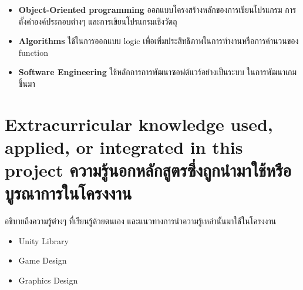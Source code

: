 \begin{itemize}
  \item \textbf{Object-Oriented programming} ออกแบบโครงสร้างหลักของการเขียนโปรแกรม การตั้งค่าองค์ประกอบต่างๆ และการเขียนโปรแกรมเชิงวัตถุ
  \item \textbf{Algorithms} ใช้ในการออกแบบ logic เพื่อเพิ่มประสิทธิภาพในการทำงานหรือการคำนวนของ function
  \item \textbf{Software Engineering} ใช้หลักการการพัฒนาซอฟต์แวร์อย่างเป็นระบบ ในการพัฒนาเกมขึ้นมา
\end{itemize}

\section{\ifenglish%
Extracurricular knowledge used, applied, or integrated in this project
\else%
ความรู้นอกหลักสูตรซึ่งถูกนำมาใช้หรือบูรณาการในโครงงาน
\fi
}

อธิบายถึงความรู้ต่างๆ ที่เรียนรู้ด้วยตนเอง และแนวทางการนำความรู้เหล่านั้นมาใช้ในโครงงาน
\begin{itemize}
  \item Unity Library 
  \item Game Design
  \item Graphics Design
\end{itemize}
